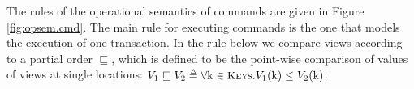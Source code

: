 The rules of the operational semantics of commands are given in Figure \ref{fig:opsem.cmd}.
The main rule for executing commands is the one that models the execution of one transaction. 
In the rule below we compare views according to a partial order $\sqsubseteq$, which 
is defined to be the point-wise comparison of values of views at single locations: 
$V_1 \sqsubseteq V_2 \triangleq \forall \key{k} \in \Addr. V_1(\key{k}) \leq V_2(\key{k})$.

